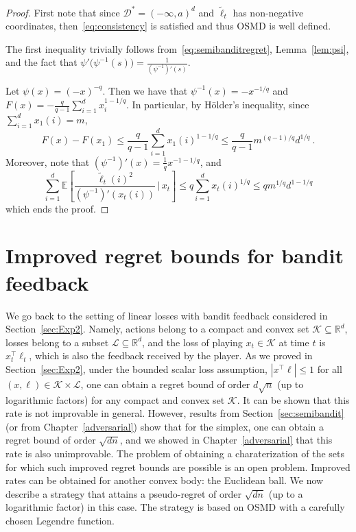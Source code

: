 \documentclass[11pt]{hackednow}
\newcommand{\E}{\mathbb{E}}
\newcommand{\R}{\mathbb{R}}
\newcommand{\cL}{\mathcal{L}}
\newcommand{\cK}{\mathcal{K}}
\newcommand{\cD}{\mathcal{D}}
\renewcommand{\tilde}{\widetilde}
\begin{document}
\begin{proof}
First note that since $\cD^*=(-\infty,a)^d$ and $\tilde{\ell}_t$ has non-negative coordinates, then~\eqref{eq:consistency} is satisfied and thus OSMD is well defined.

The first inequality trivially follows from~\eqref{eq:semibanditregret}, Lemma~\ref{lem:psi}, and the fact that $\psi'\bigl(\psi^{-1}(s)\bigr) = \frac{1}{(\psi^{-1})'(s)}$.

Let $\psi(x) = (- x)^{-q}$. Then we have that $\psi^{-1}(x) = - x^{-1/q}$ and $F(x)= - \frac{q}{q-1} \sum_{i=1}^d x_i^{1 - 1/q}$. In particular, by H{\"o}lder's inequality, since $\sum_{i=1}^d x_1(i) =m$,
$$F(x) - F(x_1) \leq \frac{q}{q-1} \sum_{i=1}^d x_1(i)^{1 - 1/q} \leq \frac{q}{q-1} m^{(q-1)/q} d^{1/q}~.$$
Moreover, note that $(\psi^{-1})'(x) = \frac1q x^{- 1 - 1/q}$, and
$$\sum_{i=1}^d \E\left[\frac{\tilde{\ell}_t(i)^2}{(\psi^{-1})'(x_t(i))} \,\bigg|\, x_t \right] \leq q \sum_{i=1}^d x_t(i)^{1/q} \leq q m^{1/q} d^{1 - 1/q}$$
which ends the proof.
\end{proof}

\section{Improved regret bounds for bandit feedback} \label{sec:ball}
We go back to the setting of linear losses with bandit feedback considered in Section~\ref{sec:Exp2}. Namely, actions belong to a compact and convex set $\cK\subseteq\R^d$, losses belong to a subset $\cL\subseteq\R^d$, and the loss of playing $x_t\in\cK$ at time $t$ is $x_t^{\top}\ell_t$, which is also the feedback received by the player. As we proved in Section~\ref{sec:Exp2}, under the bounded scalar loss assumption, $|x^{\top}\ell| \le 1$ for all $(x,\ell)\in\cK\times\cL$, one can obtain a regret bound of order $d \sqrt{n}$ (up to logarithmic factors) for any compact and convex set $\cK$. It can be shown that this rate is not improvable in general. However, results from Section~\ref{sec:semibandit} (or from Chapter~\ref{adversarial}) show that for the simplex, one can obtain a regret bound of order $\sqrt{d n}$, and we showed in Chapter~\ref{adversarial} that this rate is also unimprovable. The problem of obtaining a charaterization of the sets for which such improved regret bounds are possible is an open problem. Improved rates can be obtained for another convex body: the Euclidean ball. We now describe a strategy that attains a pseudo-regret of order $\sqrt{d n}$ (up to a logarithmic factor) in this case. The strategy is based on OSMD with a carefully chosen Legendre function.
\end{document}
